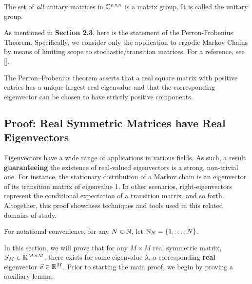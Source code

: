 \begin{theorem}
The set of {\em all} unitary matrices in $\mathbb{C}^{n\times n}$ is a matrix group. It is called the {unitary group}.
\end{theorem}

As mentioned in \textbf{Section 2.3}, here is the statement of the Perron-Frobenius Theorem.
Specifically, we consider only the application to ergodic Markov Chains by means of limiting scope to stochastic/transition matrices.
For a reference, see [\cite{levin}].

\begin{theorem}
The Perron–Frobenius theorem asserts that a real square matrix with positive entries has a unique largest real eigenvalue and that the corresponding eigenvector can be chosen to have strictly positive components.
\end{theorem}


\newpage

\subsection{Proof: Real Symmetric Matrices have Real Eigenvectors}


Eigenvectors have a wide range of applications in various fields. As such, a result \textbf{guaranteeing} the existence of real-valued eigenvectors is a strong, non-trivial one. For instance, the stationary distribution of a Markov chain is an eigenvector of its transition matrix of eigenvalue 1. In other scenarios, right-eigenvectors represent the conditional expectation of a transition matrix, and so forth. Altogether, this proof showcases techniques and tools used in this related domains of study. \newline


 For notational convenience, for any $N \in \mathbb{N}$, let $\mathbb{N}_{N} = \{1,\dots,N\}$.


In this section, we will prove that for any $M \times M$ real symmetric matrix, $S_M \in \mathbb{R}^{M \times M}$, there exists for some eigenvalue $\lambda$, a corresponding \textbf{real} eigenvector $\vec{v} \in \mathbb{R}^M$. Prior to starting the main proof, we begin by proving a auxiliary lemma. \newline

